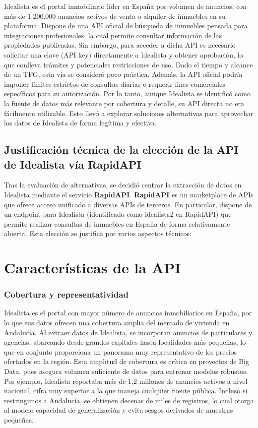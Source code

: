 \documentclass[a4paper,11pt]{book}
\begin{document}
Idealista es el portal inmobiliario líder en España por volumen de anuncios, con más de 1.200.000 anuncios activos de venta o alquiler de inmuebles en su plataforma. Dispone de una API oficial de búsqueda de inmuebles pensada para integraciones profesionales, la cual permite consultar información de las propiedades publicadas. Sin embargo, para acceder a dicha API es necesario solicitar una clave (API key) directamente a Idealista y obtener aprobación, lo que conlleva trámites y potenciales restricciones de uso. Dado el tiempo y alcance de un TFG, esta vía se consideró poco práctica. Además, la API oficial podría imponer límites estrictos de consultas diarias o requerir fines comerciales específicos para su autorización. Por lo tanto, aunque Idealista se identificó como la fuente de datos más relevante por cobertura y detalle, su API directa no era fácilmente utilizable. Esto llevó a explorar soluciones alternativas para aprovechar los datos de Idealista de forma legítima y efectiva.



\subsection{Justificación técnica de la elección de la API de Idealista vía RapidAPI}
Tras la evaluación de alternativas, se decidió centrar la extracción de datos en Idealista mediante el servicio \textbf{RapidAPI}. \textbf{RapidAPI} es un marketplace de APIs que ofrece acceso unificado a diversas APIs de terceros. En particular, dispone de un endpoint para Idealista (identificado como idealista2 en RapidAPI) que permite realizar consultas de inmuebles en España de forma relativamente abierta. Esta elección se justifica por varios aspectos técnicos:

\section{Características de la API}

\subsubsection{Cobertura y representatividad}
Idealista es el portal con mayor número de anuncios inmobiliarios en España, por lo que sus datos ofrecen una cobertura amplia del mercado de vivienda en Andalucía. Al extraer datos de Idealista, se incorporan anuncios de particulares y agencias, abarcando desde grandes capitales hasta localidades más pequeñas, lo que en conjunto proporciona un panorama muy representativo de los precios ofertados en la región. Esta amplitud de cobertura es crítica en proyectos de Big Data, pues asegura volumen suficiente de datos para entrenar modelos robustos. Por ejemplo, Idealista reportaba más de 1,2 millones de anuncios activos a nivel nacional, cifra muy superior a la que maneja cualquier fuente pública. Incluso si restringimos a Andalucía, se obtienen decenas de miles de registros, lo cual otorga al modelo capacidad de generalización y evita sesgos derivados de muestras pequeñas.
\end{document}
